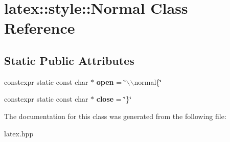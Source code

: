 \hypertarget{classlatex_1_1style_1_1Normal}{\section{latex\-:\-:style\-:\-:\-Normal \-Class \-Reference}
\label{classlatex_1_1style_1_1Normal}
}
\subsection*{\-Static \-Public \-Attributes}
\begin{DoxyCompactItemize}
\item 
\hypertarget{classlatex_1_1style_1_1Normal_ab91741000604603ad79213748fb365d0}{constexpr static const char $\ast$ {\bfseries open} = \char`\"{}$\backslash$$\backslash$normal\{\char`\"{}}\label{classlatex_1_1style_1_1Normal_ab91741000604603ad79213748fb365d0}

\item 
\hypertarget{classlatex_1_1style_1_1Normal_abc6bcd5cfedf7007237468bad885fa6a}{constexpr static const char $\ast$ {\bfseries close} = \char`\"{}\}\char`\"{}}\label{classlatex_1_1style_1_1Normal_abc6bcd5cfedf7007237468bad885fa6a}

\end{DoxyCompactItemize}


\-The documentation for this class was generated from the following file\-:\begin{DoxyCompactItemize}
\item 
latex.\-hpp\end{DoxyCompactItemize}
